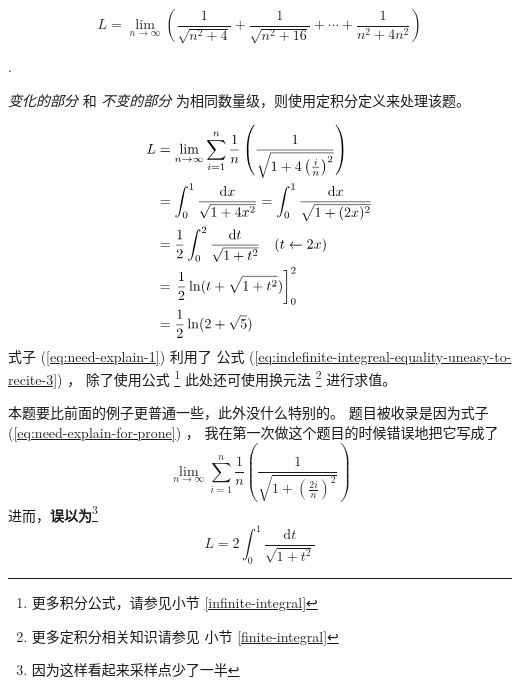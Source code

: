 \begin{example}
    \[
        L = \lim_{n \to \infty} \left(
            \frac{1}{\sqrt{n^2 + 4}} + 
            \frac{1}{\sqrt{n^2 + 16}} + 
            \cdots + 
            \frac{1}{n^2 + 4n^2}
        \right)
    \]

    \cite[question 200]{w660}.
        
    \emph{变化的部分} 和 \emph{不变的部分}
    为相同数量级，则使用定积分定义来处理该题。

    \begin{align}
        \label{eq:need-explain-for-prone} L &= \lim_{n \to \infty} \sum_{i = 1}^{n} \frac{1}{n} 
                   \left(\frac{1}{\sqrt{1 + 4\left(\frac{i}{n}\right)^2}}\right) \\
        \notag   &= \int_0^1 \frac{\mathrm dx}{\sqrt{1+4x^2}}
                  = \int_0^1 \frac{\mathrm dx}{\sqrt{1+(2x)^2}} \\
        \notag   &= \frac{1}{2} \int_0^2 \frac{\mathrm dt}{\sqrt{1+t^2}} \quad (t \gets 2x) \\
        \label{eq:need-explain-1} &= \left.\frac{1}{2} \ln(t + \sqrt{1+t^2}) \right]_{0}^{2} \\
        \notag   &= \frac{1}{2} \ln (2 + \sqrt{5})
    \end{align}
    式子 (\ref{eq:need-explain-1}) 利用了 公式 (\ref{eq:indefinite-integreal-equality-uneasy-to-recite-3}) ，
    除了使用公式
    \footnote{
        更多积分公式，请参见小节 \ref{infinite-integral}
    }
    此处还可使用换元法
    \footnote{
        更多定积分相关知识请参见 小节 \ref{finite-integral}
    }
    进行求值。

    本题要比前面的例子更普通一些，此外没什么特别的。
    题目被收录是因为式子 (\ref{eq:need-explain-for-prone}) ，
    我在第一次做这个题目的时候错误地把它写成了
    \[
        \lim_{n \to \infty} \sum_{i = 1}^{n} \frac{1}{n} 
        \left(\frac{1}{\sqrt{1 + \left(\frac{2i}{n}\right)^2}}\right)
    \]
    进而，\textbf{误以为}\footnote{因为这样看起来采样点少了一半}
    \[
        L = 2 \int_0^1 \frac{\mathrm dt}{\sqrt{1+t^2}}
    \]
\end{example}


